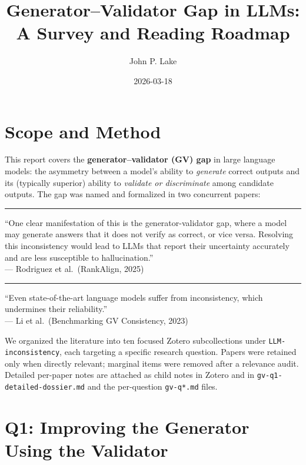 \documentclass[11pt]{article}
\title{Generator--Validator Gap in LLMs:\\A Survey and Reading Roadmap}
\author{John P. Lake}
\date{2026-03-18}
\newenvironment{paperquote}{%
  \vspace{0.5em}%
  \begin{list}{}{%
    \setlength{\leftmargin}{1.5em}%
    \setlength{\rightmargin}{0em}%
    \setlength{\topsep}{0.2em}%
    \setlength{\parsep}{0pt}%
  }%
  \item\relax\small\itshape\leavevmode%
  \hspace{-1.3em}\textcolor{gray!80}{\rule{2pt}{1em}}\hspace{0.5em}%
}{%
  \end{list}%
  \vspace{0.3em}%
}
\begin{document}
\maketitle
\tableofcontents
\clearpage

\section{Scope and Method}

This report covers the \textbf{generator--validator (GV) gap} in large language models: the asymmetry between a model's ability to \emph{generate} correct outputs and its (typically superior) ability to \emph{validate or discriminate} among candidate outputs. The gap was named and formalized in two concurrent papers:

\begin{paperquote}
\small ``One clear manifestation of this is the generator-validator gap, where a model may generate answers that it does not verify as correct, or vice versa. Resolving this inconsistency would lead to LLMs that report their uncertainty accurately and are less susceptible to hallucination.''\\
\hfill --- Rodriguez et al.\ (RankAlign, 2025)
\end{paperquote}

\begin{paperquote}
\small ``Even state-of-the-art language models suffer from inconsistency, which undermines their reliability.''\\
\hfill --- Li et al.\ (Benchmarking GV Consistency, 2023)
\end{paperquote} We organized the literature into ten focused Zotero subcollections under \texttt{LLM-inconsistency}, each targeting a specific research question. Papers were retained only when directly relevant; marginal items were removed after a relevance audit. Detailed per-paper notes are attached as child notes in Zotero and in \texttt{gv-q1-detailed-dossier.md} and the per-question \texttt{gv-q*.md} files.

\section{Q1: Improving the Generator Using the Validator}
\end{document}

